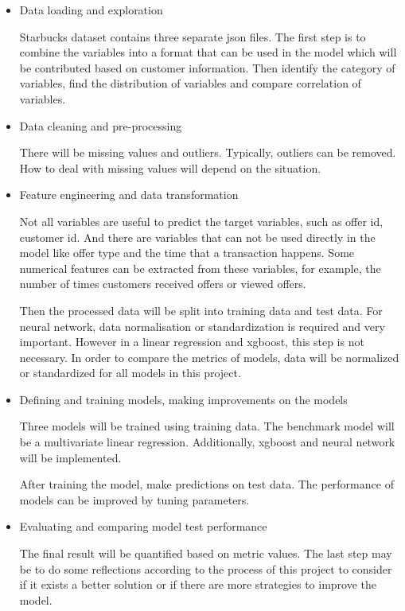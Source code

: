 \documentclass[a4paper,12pt]{article}
\begin{document}
\begin{itemize}

    \item Data loading and exploration
    
    Starbucks dataset contains three separate json files. The first step is to combine the variables into a format that can 
    be used in the model which will be contributed based on customer information. Then identify the category of variables, 
    find the distribution of variables and compare correlation of variables.

    \item Data cleaning and pre-processing
    
    There will be missing values and outliers. Typically, outliers can be removed. How to deal with missing values will 
    depend on the situation.

    \item Feature engineering and data transformation
    
    Not all variables are useful to predict the target variables, such as offer id, customer id. And there are variables that 
    can not be used directly in the model like offer type and the time that a transaction happens. Some numerical features can
    be extracted from these variables, for example, the number of times customers received offers or viewed offers.

    Then the processed data will be split into training data and test data. For neural network, data normalisation or 
    standardization is required and very important. However in a linear regression and xgboost, this step is not necessary. In 
    order to compare the metrics of models, data will be normalized or standardized for all models in this project.

    \item Defining and training models, making improvements on the models
    
    Three models will be trained using training data. The benchmark model will be a multivariate linear regression. 
    Additionally, xgboost and neural network will be implemented. 

    After training the model, make predictions on test data. The performance of models can be improved by tuning parameters.
    
    \item Evaluating and comparing model test performance
    
    The final result will be quantified based on metric values. The last step may be to do some reflections according to the 
    process of this project to consider if it exists a better solution or if there are more strategies to improve the model.

\end{itemize}
\end{document}
